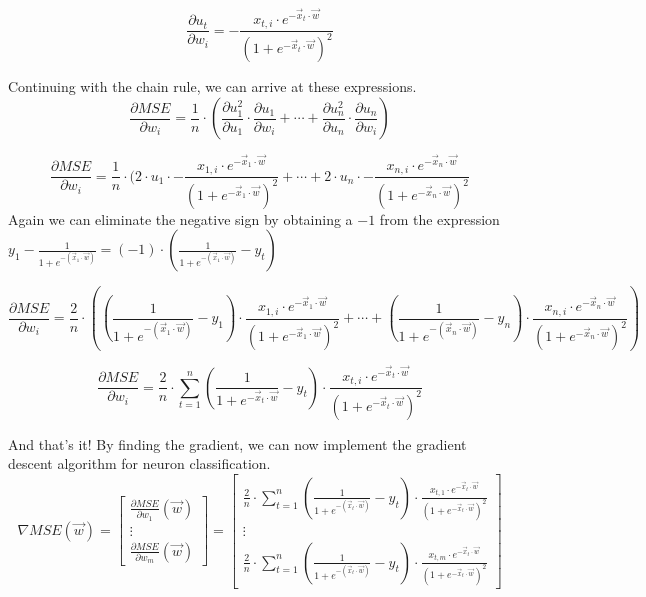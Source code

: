 \[
\frac{\partial u_t}{\partial w_i} =
- \frac{x_{t, i} \cdot e^{- \vec{x}_t \cdot \vec{w}}}
       {(1 + e^{- \vec{x}_t \cdot \vec{w}})^2}
\]

Continuing with the chain rule, we can arrive at these expressions.
\[
\frac{\partial MSE}{\partial w_i} = \frac{1}{n} \cdot (\frac{\partial u_1^2}{\partial u_1} \cdot
\frac{\partial u_1}{\partial w_i} +
\cdots + \frac{\partial u_n^2}{\partial u_n} \cdot \frac{\partial u_n}{\partial w_i})
\]


\[
\frac{\partial MSE}{\partial w_i} = \frac{1}{n} \cdot (2 \cdot u_1 \cdot
- \frac{x_{1, i} \cdot e^{- \vec{x}_1 \cdot \vec{w}}}{(1 + e^{- \vec{x}_1 \cdot \vec{w}})^2}
+ \cdots +
2 \cdot u_n \cdot
- \frac{x_{n, i} \cdot e^{- \vec{x}_n \cdot \vec{w}}}{(1 + e^{- \vec{x}_n \cdot \vec{w}})^2}
\]
Again we can eliminate the negative sign by obtaining a $-1$ from the expression
$y_1 - \frac{1}{1 + e^{-(\vec{x}_1 \cdot \vec{w})}} = (-1) \cdot (\frac{1}{1 + e^{-(\vec{x}_1 \cdot \vec{w})}} - y_t)$

\[
\frac{\partial MSE}{\partial w_i} = \frac{2}{n} \cdot (
(\frac{1}{1 + e^{-(\vec{x}_1 \cdot \vec{w})}} - y_1) \cdot
\frac{x_{1, i} \cdot e^{- \vec{x}_1 \cdot \vec{w}}}{(1 + e^{- \vec{x}_1 \cdot \vec{w}})^2}
+ \cdots +
(\frac{1}{1 + e^{-(\vec{x}_n \cdot \vec{w})}} - y_n) \cdot
\frac{x_{n, i} \cdot e^{- \vec{x}_n \cdot \vec{w}}}{(1 + e^{- \vec{x}_n \cdot \vec{w}})^2}
)
\]


\[
\frac{\partial MSE}{\partial w_i} = \frac{2}{n} \cdot \sum_{t = 1}^n
(\frac{1}{1 + e^{-\vec{x}_t \cdot \vec{w}}} - y_t) \cdot
\frac{x_{t, i} \cdot e^{- \vec{x}_t \cdot \vec{w}}}{(1 + e^{- \vec{x}_t \cdot \vec{w}})^2}
\]

And that's it! By finding the gradient, we can now implement the gradient descent algorithm
for neuron classification.
\[
\nabla MSE(\vec{w}) =
\begin{bmatrix} \frac{\partial MSE}{\partial w_1}(\vec{w})
  \\ \vdots
  \\ \frac{\partial MSE}{\partial w_m}(\vec{w})
\end{bmatrix} =
\begin{bmatrix} \frac{2}{n} \cdot \sum_{t = 1}^n
  (\frac{1}{1 + e^{-(\vec{x}_t \cdot \vec{w})}} - y_t) \cdot
  \frac{x_{t, 1} \cdot e^{- \vec{x}_t \cdot \vec{w}}}{(1 + e^{- \vec{x}_t \cdot \vec{w}})^2}
  \\ \vdots
  \\ \frac{2}{n} \cdot \sum_{t = 1}^n  (\frac{1}{1 + e^{-(\vec{x}_t \cdot \vec{w})}} - y_t) \cdot
  \frac{x_{t, m} \cdot e^{- \vec{x}_t \cdot \vec{w}}}{(1 + e^{- \vec{x}_t \cdot \vec{w}})^2}
\end{bmatrix}
\]

